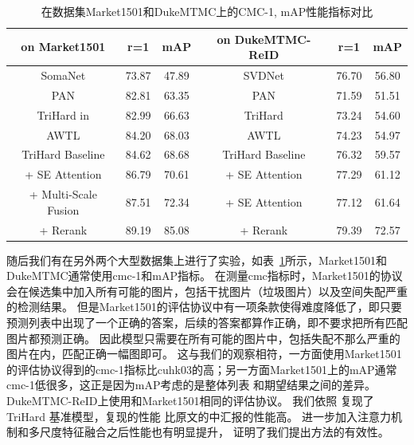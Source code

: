 \begin{table}
	\centering
	\caption{在数据集Market1501和DukeMTMC上的CMC-1, mAP性能指标对比}
	\label{tab:market}
	\begin{tabular}{c|cc|c|cc}
		\hline
		on Market1501                        & r=1   & mAP   & on DukeMTMC-ReID & r=1   & mAP   \\ \hline 
		SomaNet                              & 73.87 & 47.89 & SVDNet           & 76.70 & 56.80 \\ 
		PAN                                  & 82.81 & 63.35 & PAN              & 71.59 & 51.51 \\  
		TriHard in \cite{hermans2017defense} & 82.99 & 66.63 & TriHard          & 73.24 & 54.60 \\ 
		AWTL                                 & 84.20 & 68.03 & AWTL             & 74.23 & 54.97 \\ \hline  \hline 
		TriHard Baseline                     & 84.62 & 68.68 & TriHard Baseline & 76.32 & 59.57 \\
		+ SE Attention                       & 86.79 & 70.61 & + SE Attention   & 77.29 & 61.12 \\
		+ Multi-Scale Fusion                 & 87.51 & 72.34 & + SE Attention   & 77.12 & 61.64 \\
		+ Rerank                             & 89.19 & 85.08 & + Rerank         & 79.39 & 72.57 \\ \hline
	\end{tabular}
\end{table}


随后我们有在另外两个大型数据集上进行了实验，如表~\ref{tab:market}所示，Market1501和DukeMTMC通常使用cmc-1和mAP指标。
在测量cmc指标时，Market1501的协议会在候选集中加入所有可能的图片，包括干扰图片（垃圾图片）以及空间失配严重的检测结果。
但是Market1501的评估协议中有一项条款使得难度降低了，即只要预测列表中出现了一个正确的答案，后续的答案都算作正确，即不要求把所有匹配图片都预测正确。
因此模型只需要在所有可能的图片中，包括失配不那么严重的图片在内，匹配正确一幅图即可。
这与我们的观察相符，一方面使用Market1501的评估协议得到的cmc-1指标比cuhk03的高；另一方面Market1501上的mAP通常cmc-1低很多，这正是因为mAP考虑的是整体列表
和期望结果之间的差异。
DukeMTMC-ReID上使用和Market1501相同的评估协议。
我们依照\cite{hermans2017defense} 复现了TriHard 基准模型，复现的性能
比原文的中汇报的性能高。
进一步加入注意力机制和多尺度特征融合之后性能也有明显提升，
证明了我们提出方法的有效性。

